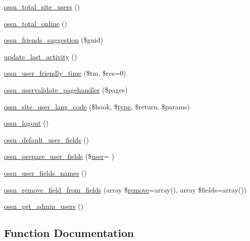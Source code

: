 \begin{DoxyCompactItemize}
\item 
\hyperlink{ossn_8lib_8users_8php_abb0e34ced8dacbd7a750b8bb2c692f9c}{ossn\+\_\+total\+\_\+site\+\_\+users} ()
\item 
\hyperlink{ossn_8lib_8users_8php_a0787f7b34c488619fffd3febdf9a723c}{ossn\+\_\+total\+\_\+online} ()
\item 
\hyperlink{ossn_8lib_8users_8php_a885fee28005f891120cc43ca44426c30}{ossn\+\_\+friends\+\_\+suggestion} (\$guid)
\item 
\hyperlink{ossn_8lib_8users_8php_a451896c212bc72020029642e8c86e343}{update\+\_\+last\+\_\+activity} ()
\item 
\hyperlink{ossn_8lib_8users_8php_a344ba112ee6fd7f1aedbe9bf3a92ce68}{ossn\+\_\+user\+\_\+friendly\+\_\+time} (\$tm, \$rcs=0)
\item 
\hyperlink{ossn_8lib_8users_8php_ac29e609f70bf2a0f33b600fc71b4201a}{ossn\+\_\+uservalidate\+\_\+pagehandler} (\$pages)
\item 
\hyperlink{ossn_8lib_8users_8php_a475b2321305b4420110672699d5b5842}{ossn\+\_\+site\+\_\+user\+\_\+lang\+\_\+code} (\$hook, \$\hyperlink{_ossn_wall_2actions_2wall_2post_2group_8php_a2dc1bb4e1ed0029daa81ac0776b14b51}{type}, \$return, \$params)
\item 
\hyperlink{ossn_8lib_8users_8php_aeece5134661ae25738f7a4d3b5c20f76}{ossn\+\_\+logout} ()
\item 
\hyperlink{ossn_8lib_8users_8php_a17b6a923a5faa7e3c5f6223854557a72}{ossn\+\_\+default\+\_\+user\+\_\+fields} ()
\item 
\hyperlink{ossn_8lib_8users_8php_aa6c0fa7ee8f8d7d00ce56782fad5ea38}{ossn\+\_\+prepare\+\_\+user\+\_\+fields} (\$\hyperlink{ossn_8config_8db_8example_8php_a802544b7ba9f79bbf24ef67773d53bed}{user}= \textquotesingle{}\textquotesingle{})
\item 
\hyperlink{ossn_8lib_8users_8php_a67125cfdd672959bff2d8dbd44034cb0}{ossn\+\_\+user\+\_\+fields\+\_\+names} ()
\item 
\hyperlink{ossn_8lib_8users_8php_a7d84445a19bbd60864852cf652011706}{ossn\+\_\+remove\+\_\+field\+\_\+from\+\_\+fields} (array \$\hyperlink{fullpage_2plugin_8min_8js_a3fe72a3812c61d06ea7c5cf2052f3dd2}{remove}=array(), array \$fields=array())
\item 
\hyperlink{ossn_8lib_8users_8php_acada9d31271f47fbd7d9e5e956852322}{ossn\+\_\+get\+\_\+admin\+\_\+users} ()
\end{DoxyCompactItemize}


\subsection{Function Documentation}
